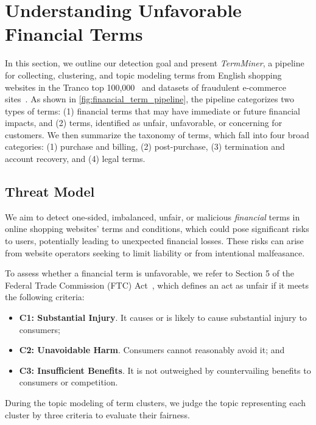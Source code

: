 \section{Understanding Unfavorable Financial Terms}
\label{sec:topic_modeling_section}

In this section, we outline our detection goal and present \textit{TermMiner}, a pipeline for collecting, clustering, and topic modeling \termname terms from English shopping websites in the Tranco top 100,000~\citep{tranco} and datasets of fraudulent e-commerce sites~\citep{bitaab2023beyond, janaviciute2023fraudulent}. As shown in \autoref{fig:financial_term_pipeline}, the pipeline categorizes two types of terms: (1) financial terms that may have immediate or future financial impacts, and (2) \termname terms, identified as unfair, unfavorable, or concerning for customers. We then summarize the taxonomy of \termname terms, which fall into four broad categories: (1) purchase and billing, (2) post-purchase, (3) termination and account recovery, and (4) legal terms.

\subsection{Threat Model}
\label{ssec:ftc}

We aim to detect one-sided, imbalanced, unfair, or malicious \textit{financial} terms in online shopping websites' terms and conditions, which could pose significant risks to users, potentially leading to unexpected financial losses. These risks can arise from website operators seeking to limit liability or from intentional malfeasance.

To assess whether a financial term is unfavorable, we refer to Section 5 of the Federal Trade Commission (FTC) Act~\citep{ftcact}, which defines an act as unfair if it meets the following criteria:

\begin{itemize}
    \item \textbf{C1: Substantial Injury}. It causes or is likely to cause substantial injury to consumers;
    \item \textbf{C2: Unavoidable Harm}. Consumers cannot reasonably avoid it; and
    \item \textbf{C3: Insufficient Benefits}. It is not outweighed by countervailing benefits to consumers or competition. 
\end{itemize}

During the topic modeling of term clusters, we judge the topic representing each cluster by three criteria to evaluate their fairness.

